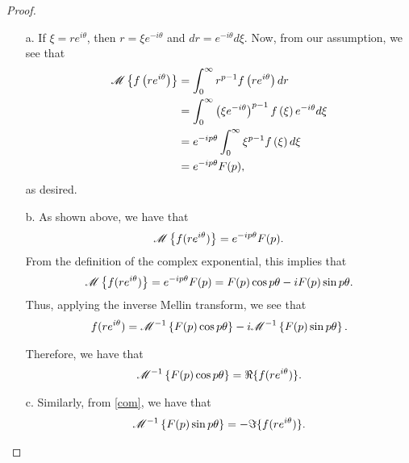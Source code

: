 \begin{proof}
  \begin{enumerate}
    \item[a.] If $\xi = r e^{i \theta}$, then $r = \xi e^{-i \theta}$ and $dr = e^{-i \theta}d \xi $.
      Now, from our assumption, we see that
      \begin{align*}
        \mathscr{M}\left\{ {f\left(r e^{i\theta}\right)} \right\}
        &= \int_0^\infty r^{p-1} f\left(r e^{i\theta}\right) dr \\
        &= \int_0^\infty \left(\xi e^{-i \theta}\right)^{p-1} f\left(\xi\right) e^{-i\theta} d\xi \\
        &= e^{-ip\theta} \int_0^\infty \xi^{p-1} f\left(\xi\right) d\xi \\
        &= e^{-ip\theta} F(p),
      \end{align*}
      as desired.

    \item[b.] As shown above, we have that
      \begin{align*}
        \mathscr{M}\left\{ {f(r e^{i \theta})} \right\} = e^{-ip\theta}F(p).
      \end{align*}
      From the definition of the complex exponential, this implies that
      \begin{align*}
        \mathscr{M}\left\{ {f(r e^{i \theta})} \right\} = e^{-ip\theta}F(p) = F(p)\cos p\theta  -i F(p)\sin p \theta.
      \end{align*}
      Thus, applying the inverse Mellin transform, we see that
      \begin{align}\label{com}
        f(r e^{i \theta}) = \mathscr{M}^{-1}\left\{ {F(p)\cos p\theta} \right\} -i \mathscr{M}^{-1}\left\{ {F(p)\sin p \theta } \right\}.
      \end{align}

      Therefore, we have that
      \begin{align*}
        \mathscr{M}^{-1}\left\{ {F(p)\cos p\theta } \right\} = \Re{\{f(r e^{i \theta})\}}.
      \end{align*}

    \item[c.] Similarly, from \eqref{com}, we have that
      \begin{align*}
        \mathscr{M}^{-1}\left\{ {F(p) \sin p\theta} \right\} = -\Im{\{f(r e^{i \theta})\}}.
      \end{align*}
  \end{enumerate}
\end{proof}
\newpage
